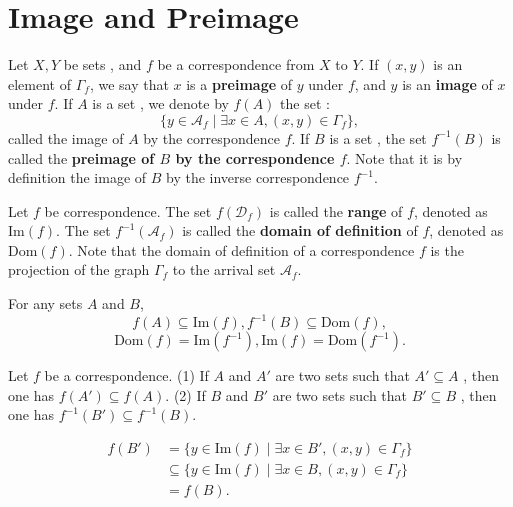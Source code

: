 \section{Image and Preimage}
\begin{definitionenv}
    Let $X, Y$ be sets , and $f$ be a correspondence from $X$ to $Y$. If $(x, y)$ is an element of $\Gamma_f$,  we say that $x$ is a \textbf{preimage } of $y$ under $f$,  and $y$ is an \textbf{image} of $x$ under $f$.
    \newline
    If $A$ is a set ,  we denote by $f(A)$ the set :
    $$\{y\in \mathscr{A}_f\mid \exists x\in A , (x, y)\in \Gamma_f\}, $$
    called the image of $A$ by the correspondence $f$.
    \newline 
    If $B$ is a set , the set $f^{-1} (B)$ is called the \textbf{preimage of $B$ by the correspondence $f$}. Note that it is by definition the image of $B$ by the inverse correspondence $f^{-1}$.
\end{definitionenv}
\begin{definitionenv}
    Let $f$ be correspondence. The set $f(\mathscr{D}_f)$ is called the \textbf{range} of $f$,  denoted as $\mathrm{Im} (f)$. The set $f^{-1}(\mathscr{A}_f)$ is called the \textbf{domain of definition }of $f$,  denoted as $\mathrm{Dom}( f) $.
    Note that the domain of definition of a correspondence $f$ is the projection of the graph $\Gamma_f$ to the arrival set $\mathscr{A}_f$.
\end{definitionenv}
\begin{box2}
    For any sets $ A$ and $B$, 
$$f(A)\subseteq \mathrm{Im}(f), f^{-1}(B)\subseteq\mathrm{Dom}(f), $$
$$\mathrm{Dom}(f)=\mathrm{Im}(f^{-1}), \mathrm{Im }(f)=\mathrm{Dom}(f^{-1}).$$
\end{box2}
\begin{propositionenv}\label{proposition3.3.1}
    Let $f$ be a correspondence.
    \newline
    (1) If $A$ and $A'$ are two sets such that $A'\subseteq A$ , then one has $f(A')\subseteq f(A)$.
    \newline
    (2) If $B$ and $B'$ are two sets such that $B'\subseteq B$ , then one has $f^{-1}(B')\subseteq f^{-1}(B)$.
\end{propositionenv}
\begin{proofenv}
    \begin{align*}
        f(B')&=\{y\in\mathrm{Im}(f)\mid \exists x\in B', (x, y)\in \Gamma_f\}\\
        &\subseteq\{y\in\mathrm{Im}(f)\mid \exists x\in B, (x, y)\in \Gamma_f\}\\
        &=f(B).
    \end{align*}
\end{proofenv}    
